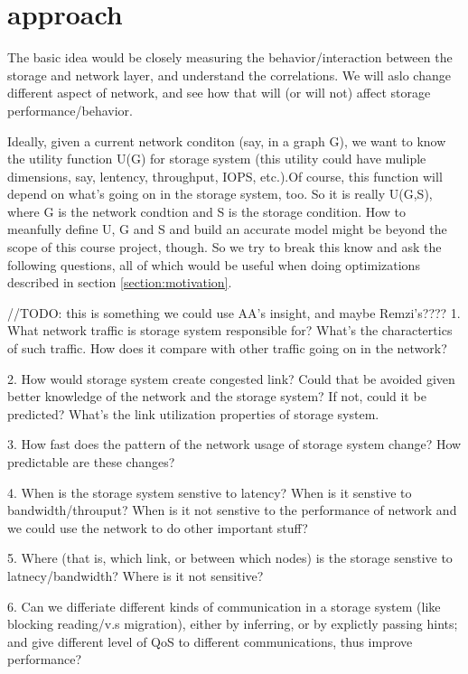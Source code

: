 \section{approach}
\label{sec:approach}
The basic idea would be closely measuring the behavior/interaction between the storage and network layer, and understand the correlations. We will aslo change different aspect of network, and see how that will (or will not) affect storage performance/behavior.

Ideally, given a current network conditon (say, in a graph G), we want to know the utility function U(G) for storage system (this utility could have muliple dimensions, say, lentency, throughput, IOPS, etc.).Of course, this function will depend on what's going on in the storage system, too. So it is really U(G,S), where G is the network condtion and S is the storage  condition. How to meanfully define U, G and S and build an accurate model might be beyond the scope of this course project, though. So we try to break this know and ask the following questions, all of which would be useful when doing optimizations described in section \ref{section:motivation}.

//TODO: this is something we could use AA's insight, and maybe Remzi's????
1. What network traffic is storage system responsible for? What's the charactertics of such traffic. How does it compare with other traffic going on in the network?

2. How would storage system create congested link? Could that be avoided given better knowledge of the network and the storage system? If not, could it be predicted? What's the link utilization properties of storage system.

3. How fast does the pattern of the network usage of storage system change? How predictable are these changes?

4. When is the storage system senstive to latency? When is it senstive to bandwidth/throuput? When is it not senstive to the performance of network and we could use the network to do other important stuff? 

5. Where (that is, which link, or between which nodes) is the storage senstive to latnecy/bandwidth? Where is it not sensitive?

6. Can we differiate different kinds of communication in a storage system (like blocking reading/v.s migration), either by inferring, or by explictly passing hints; and give different level of QoS to different communications, thus improve performance?

